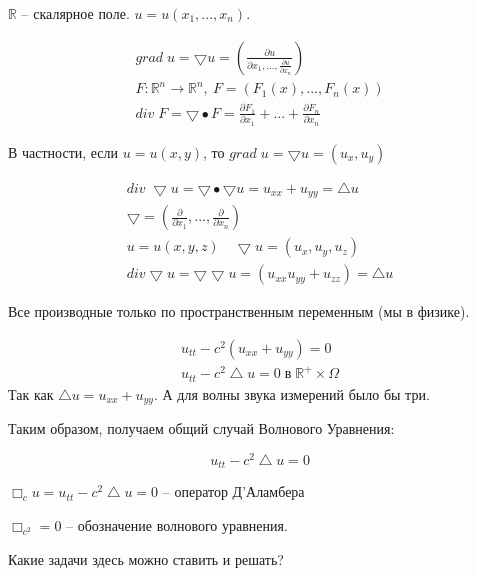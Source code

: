 \documentclass[12pt]{report}
\begin{document}
$\mathbb{R}$ -- скалярное поле. $u = u(x_1, ..., x_n)$.

$$
    \begin{gathered}
        grad \; u = \bigtriangledown u = ( \frac{\partial u}{\partial x_1, ..., \frac{\partial u}{\partial x_n}})
        \\
        F: \mathbb{R} ^ n \longrightarrow \mathbb{R} ^ n, \: F = (F_1(x), ..., F_n(x))
        \\
        div \; F = \bigtriangledown \bullet F = \frac{\partial F_1}{\partial x_1} + ... + \frac{\partial F_n}{\partial x_n}
    \end{gathered}
$$

В частности, если $u = u(x, y)$, то $grad \; u = \bigtriangledown u = (u_x, u_y)$

$$
    \begin{gathered}
        div \; \bigtriangledown u = \bigtriangledown \bullet \bigtriangledown u = u_{xx} + u_{yy} = \bigtriangleup u
        \\
        \bigtriangledown = (\frac{\partial}{\partial x_1}, ..., \frac{\partial}{\partial x_n})
        \\
        u = u(x, y, z) \quad \bigtriangledown u = (u_x, u_y, u_z)
        \\
        div \bigtriangledown u = \bigtriangledown \bigtriangledown u = (u_{xx} u_{yy} + u_{zz}) = \bigtriangleup u
    \end{gathered}
$$

Все производные только по пространственным переменным (мы в физике).

$$
    \begin{gathered}
        u_{tt} - c^2 (u_{xx} + u_{yy}) = 0
        \\
        u_{tt} - c ^ 2 \bigtriangleup u = 0 \; \text{в} \; \mathbb{R} ^ + \times \Omega 
    \end{gathered}
$$
Так как $\bigtriangleup u = u_{xx} + u_{yy}$. А для волны звука измерений было бы три. 

Таким образом, получаем общий случай Волнового Уравнения: 

\begin{equation} \label{eq:gen_wave}
    u_{tt} - c ^ 2 \bigtriangleup u = 0 
\end{equation}

$\Box_c u = u_{tt} - c ^ 2 \bigtriangleup u = 0$ -- оператор Д'Аламбера

$\Box_{c ^ 2} = 0$ -- обозначение волнового уравнения.

Какие задачи здесь можно ставить и решать? 
\end{document}
